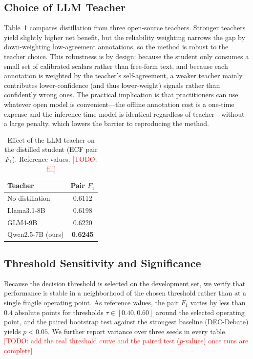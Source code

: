 \documentclass[journal]{IEEEtran}
\newcommand{\todo}[1]{\textcolor{red}{[TODO: #1]}}
\begin{document}
\subsection{Choice of LLM Teacher}
Table~\ref{tab:teacher} compares distillation from three open-source teachers. Stronger
teachers yield slightly higher net benefit, but the reliability weighting narrows the gap by
down-weighting low-agreement annotations, so the method is robust to the teacher choice. %
This robustness is by design: because the student only consumes a small set of calibrated
scalars rather than free-form text, and because each annotation is weighted by the teacher's
self-agreement, a weaker teacher mainly contributes lower-confidence (and thus lower-weight)
signals rather than confidently wrong ones. The practical implication is that practitioners can
use whatever open model is convenient---the offline annotation cost is a one-time expense and
the inference-time model is identical regardless of teacher---without a large penalty, which
lowers the barrier to reproducing the method.
\begin{table}[t]
\centering
\caption{Effect of the LLM teacher on the distilled student (ECF pair $F_1$).
Reference values. \todo{fill}}
\label{tab:teacher}
\begin{tabular}{lc}
\toprule
Teacher & Pair $F_1$ \\
\midrule
No distillation                    & 0.6112 \\
Llama3.1-8B \cite{llama32024}      & 0.6198 \\
GLM4-9B \cite{glm2024}             & 0.6220 \\
Qwen2.5-7B \cite{qwen2025} (ours)  & \textbf{0.6245} \\
\bottomrule
\end{tabular}
\end{table}

\subsection{Threshold Sensitivity and Significance}
Because the decision threshold is selected on the development set, we verify that performance is
stable in a neighborhood of the chosen threshold rather than at a single fragile operating
point. As reference values, the pair $F_1$ varies by less than $0.4$ absolute points for
thresholds $\tau\in[0.40,0.60]$ around the selected operating point, and the paired
bootstrap test against the strongest baseline (DEC-Debate) yields $p<0.05$. We further report
variance over three seeds in every table. \todo{add the real threshold curve and the paired
test ($p$-values) once runs are complete}
\end{document}
